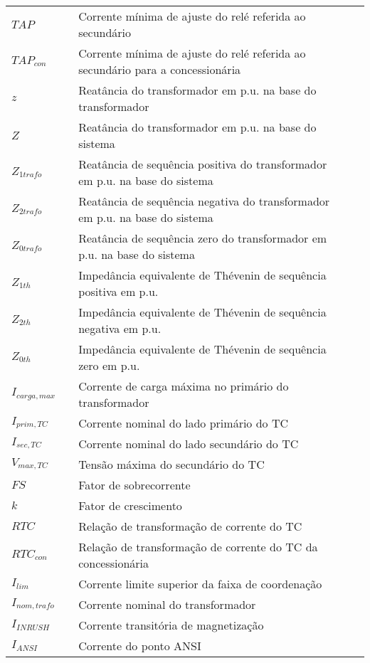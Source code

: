 \begin{table}[H]
\begin{adjustbox}{width=\columnwidth,center}
\begin{tabular}{lllll}
\textbf{$TAP$} &  & Corrente mínima de ajuste do relé referida ao secundário \\
\textbf{$TAP_{con}$} &  & Corrente mínima de ajuste do relé referida ao secundário para a concessionária\\

\textbf{$z$} &  & Reatância do transformador em p.u. na base do transformador \\
\textbf{$Z$} &  & Reatância do transformador em p.u. na base do sistema \\
\textbf{$Z_{1trafo}$} &  & Reatância de sequência positiva do transformador em p.u. na base do sistema \\
\textbf{$Z_{2trafo}$} &  & Reatância de sequência negativa do transformador em p.u. na base do sistema \\
\textbf{$Z_{0trafo}$} &  & Reatância de sequência zero do transformador em p.u. na base do sistema \\
\textbf{$Z_{1th}$} &  &  Impedância equivalente de Thévenin de sequência positiva em p.u. \\
\textbf{$Z_{2th}$} &  &  Impedância equivalente de Thévenin de sequência negativa em p.u. \\
\textbf{$Z_{0th}$} &  &  Impedância equivalente de Thévenin de sequência zero em p.u. \\

\textbf{$I_{carga,max}$} &  &  Corrente de carga máxima no primário do transformador \\
\textbf{$I_{prim,TC}$} &  &  Corrente nominal do lado primário do TC \\
\textbf{$I_{sec,TC}$} &  &  Corrente nominal do lado secundário do TC \\
\textbf{$V_{max,TC}$} &  &  Tensão máxima do secundário do TC \\

\textbf{$FS$} &  &  Fator de sobrecorrente \\
\textbf{$k$} &  &  Fator de crescimento \\
\textbf{$RTC$} &  &  Relação de transformação de corrente do TC \\
\textbf{$RTC_{con}$} &  &  Relação de transformação de corrente do TC da concessionária \\
\textbf{$I_{lim}$} &  &  Corrente limite superior da faixa de coordenação \\
\textbf{$I_{nom,trafo}$} &  &  Corrente nominal do transformador \\
\textbf{$I_{INRUSH}$} &  &  Corrente transitória de magnetização  \\
\textbf{$I_{ANSI}$} &  &  Corrente do ponto ANSI \\




\end{tabular}
\end{adjustbox}
\end{table}
